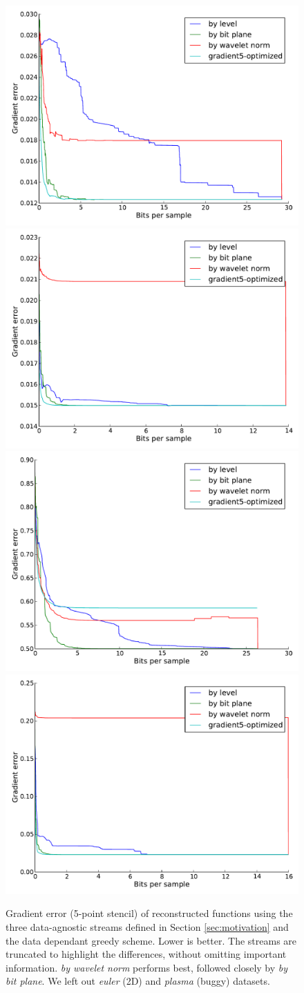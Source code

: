 \begin{figure}
  \centering
        {\includegraphics[width=0.48\linewidth]{img/motivation-3d/gradient5-boiler.pdf}}
 	{\includegraphics[width=0.48\linewidth]{img/motivation-3d/gradient5-diffusivity.pdf}}
 	{\includegraphics[width=0.48\linewidth]{img/motivation-3d/gradient5-turbulence.pdf}}
 	{\includegraphics[width=0.48\linewidth]{img/motivation-3d/gradient5-velocityz.pdf}}
 	\caption{Gradient error (5-point stencil) of reconstructed functions using the three data-agnostic streams
 	defined in Section \ref{sec:motivation} and the data dependant greedy scheme. Lower is better.
        The streams are truncated to highlight
 	the differences, without omitting important information. \emph{by wavelet norm} performs best,
 	followed closely by \emph{by bit plane}. We left out \emph{euler} (2D) and \emph{plasma} (buggy) datasets.
        }
 	\label{fig:motivation-3d-rmse}
\end{figure}

